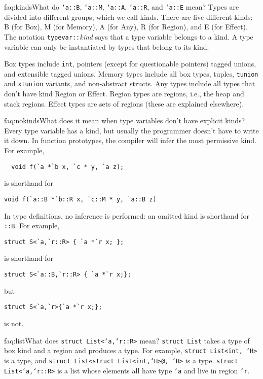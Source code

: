 \begin{faqa}{faq:kinds}{What do \texttt{`a::B}, \texttt{`a::M}, \texttt{`a::A}, \texttt{`a::R}, and \texttt{`a::E} mean?}
Types are divided into different groups, which we call kinds.  There
are five different kinds: B (for Box), M (for Memory), A (for Any), R
(for Region), and E (for Effect).  The notation
\texttt{typevar}\texttt{::}\textit{kind} says that a type variable
belongs to a kind.  A type variable can only be instantiated by types
that belong to its kind.

Box types include \texttt{int}, pointers (except for questionable
pointers) tagged unions, and extensible tagged unions.
Memory types include all box types, tuples, \texttt{tunion} and
\texttt{xtunion} variants, and non-abstract structs.
Any types include all types that don't have kind Region or Effect.
Region types are regions, i.e., the heap and stack regions.
Effect types are sets of regions (these are explained elsewhere).
\end{faqa}

\begin{faqa}{faq:nokinds}{What does it mean when type variables don't have explicit kinds?}
Every type variable has a kind, but usually the programmer doesn't
have to write it down.  In function prototypes, the compiler will
infer the most permissive kind.  For example,
\begin{verbatim}
  void f(`a *`b x, `c * y, `a z);
\end{verbatim}
is shorthand for
\begin{verbatim}
void f(`a::B *`b::R x, `c::M * y, `a::B z)
\end{verbatim}
In type definitions, no inference is performed: an omitted kind is
shorthand for \texttt{::B}.  For example,
\begin{verbatim}
struct S<`a,`r::R> { `a *`r x; };
\end{verbatim}
is shorthand for
\begin{verbatim}
struct S<`a::B,`r::R> { `a *`r x;};
\end{verbatim}
but
\begin{verbatim}
struct S<`a,`r>{`a *`r x;};
\end{verbatim}
is not.
\end{faqa}

\begin{faqa}{faq:list}{What does \texttt{struct List<`a,`r::R>} mean?}
\texttt{struct List} takes a type of box kind and a region and
produces a type.  For example, \texttt{struct List<int, `H>} is a
type, and \texttt{struct List<struct List<int,`H>@, `H>} is a type.
\texttt{struct List<`a,`r::R>} is a list whose elements all have type
\texttt{`a} and live in region \texttt{`r}.
\end{faqa}

